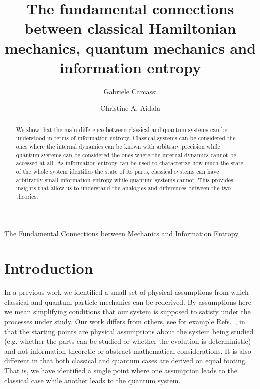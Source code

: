 \documentclass{article}
\begin{document}
\title{The fundamental connections between classical Hamiltonian mechanics, quantum mechanics and information entropy}

\author[\dagger]{Gabriele Carcassi}

\author[\dagger]{Christine A. Aidala}


\maketitle

\begin{abstract}
We show that the main difference between classical and quantum systems can be understood in terms of information entropy. Classical systems can be considered the ones where the internal dynamics can be known with arbitrary precision while quantum systems can be considered the ones where the internal dynamics cannot be accessed at all. As information entropy can be used to characterize how much the state of the whole system identifies the state of its parts, classical systems can have arbitrarily small information entropy while quantum systems cannot. This provides insights that allow us to understand the analogies and differences between the two theories.
\end{abstract}



{The Fundamental Connections between Mechanics and Information Entropy}

\section{Introduction}
In a previous work\cite{Carc1} we identified a small set of physical assumptions from which classical and quantum particle mechanics can be rederived. By assumptions here we mean simplifying conditions that our system is supposed to satisfy under the processes under study. Our work differs from others, see for example Refs.~\cite{PhysRevA.84.012311,QLogicReview,Hardy:2001jk,ludwig_hein_2013}, in that the starting points are physical assumptions about the system being studied (e.g. whether the parts can be studied or whether the evolution is deterministic) and not information theoretic or abstract mathematical considerations. It is also different in that both classical and quantum cases are derived on equal footing. That is, we have identified a single point where one assumption leads to the classical case while another leads to the quantum system.
\end{document}
